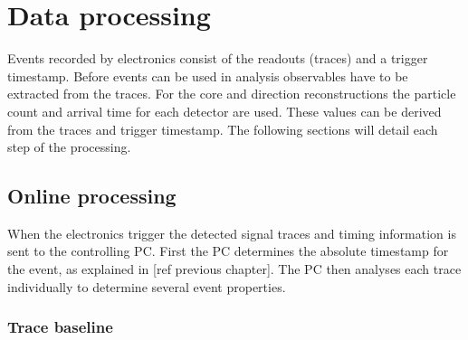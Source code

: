 \chapter{Data processing}
\label{ch:data_processing}

Events recorded by \hisparc electronics consist of the \pmt readouts (traces) and a trigger timestamp. Before events can be used in analysis observables have to be extracted from the traces. For the core and direction reconstructions the particle count and arrival time for each detector are used. These values can be derived from the traces and trigger timestamp. The following sections will detail each step of the processing.


\section{Online processing}
\label{sec:online}

When the \hisparc electronics trigger the detected signal traces and timing information is sent to the controlling PC. First the PC determines the absolute \gps timestamp for the event, as explained in [ref previous chapter]. The PC then analyses each trace individually to determine several event properties.


\subsection{Trace baseline}

